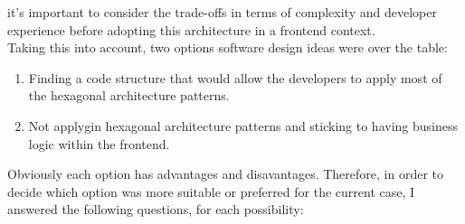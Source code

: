 \documentclass[../design.tex]{subfiles}
\begin{document}
it's important to consider the trade-offs in terms of complexity and developer
experience before adopting this architecture in a frontend context.
\\[8pt]
Taking this into account, two options software design ideas were over the table:
\begin{enumerate}
	\item Finding a code structure that would allow the developers to apply most
	      of the hexagonal architecture patterns.
	\item Not applygin hexagonal architecture patterns and sticking to
	      having business logic within the frontend.
\end{enumerate}
Obviously each option has advantages and disavantages. Therefore, in order to
decide which option was more suitable or preferred for the current case, I
answered the following questions, for each possibility:
\end{document}
